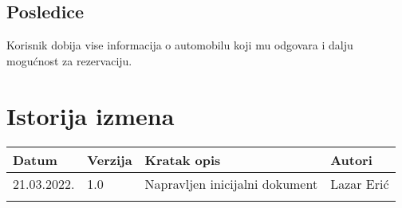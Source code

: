 \documentclass[12pt]{article}
\begin{document}
\subsection{Posledice}
Korisnik dobija vise informacija o automobilu koji mu odgovara i dalju mogućnost za rezervaciju.

\section{Istorija izmena}
\begin{center}
\begin{tabular}{ | m{2cm} | m{1.5cm}| m{6cm} | m{5cm} | } 
\hline
Datum & Verzija & Kratak opis & Autori \\ 
\hline
 21.03.2022. & 1.0 & Napravljen inicijalni dokument & Lazar Erić\\ 
\hline
&&&\\ 
\hline
\end{tabular}
\end{center}
\end{document}
